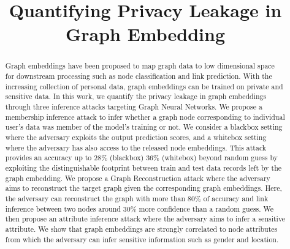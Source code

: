 \documentclass[sigconf]{acmart}
\begin{document}

\title{Quantifying Privacy Leakage in Graph Embedding}







\begin{abstract}


Graph embeddings have been proposed to map graph data to low dimensional space for downstream processing such as node classification and link prediction. With the increasing collection of personal data, graph embeddings can be trained on private and sensitive data. In this work, we quantify the privacy leakage in graph embeddings through three inference attacks targeting Graph Neural Networks. We propose a membership inference attack to infer whether a graph node corresponding to individual user's data was member of the model's training or not. We consider a blackbox setting where the adversary exploits the output prediction scores, and a whitebox setting where the adversary has also access to the released node embeddings. This attack provides an accuracy up to 28\% (blackbox) 36\% (whitebox) beyond random guess by exploiting the distinguishable footprint between train and test data records left by the graph embedding. We propose a Graph Reconstruction attack where the adversary aims to reconstruct the target graph given the corresponding graph embeddings. Here, the adversary can reconstruct the graph with more than 80\% of accuracy and link inference between two nodes around 30\% more confidence than a random guess. We then propose an attribute inference attack where the adversary aims to infer a sensitive attribute. We show that graph embeddings are strongly correlated to node attributes from which the adversary can infer sensitive information such as gender and location.




\end{abstract}
\end{document}
